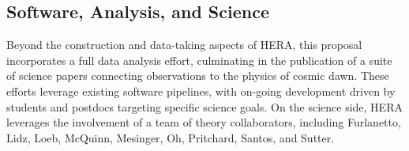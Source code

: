 \documentclass[ars]{/Users/daviddeboer1/Documents/Papers/Copernicus_LaTeX_Package_v_2_7/copernicus}
\begin{document}
%
%

\subsection{Software, Analysis, and Science}
\label{sec:analysis}

Beyond the construction and data-taking aspects of HERA, this proposal
incorporates a full data analysis effort, culminating in the publication of a
suite of science papers connecting observations to the physics of cosmic dawn.
These efforts leverage existing software pipelines, with on-going 
development driven by students and postdocs targeting specific science goals.
On the science side, HERA leverages the involvement of a team of theory collaborators,
including Furlanetto, Lidz, Loeb, McQuinn, Mesinger, Oh, Pritchard, Santos, and Sutter.

\end{document}
